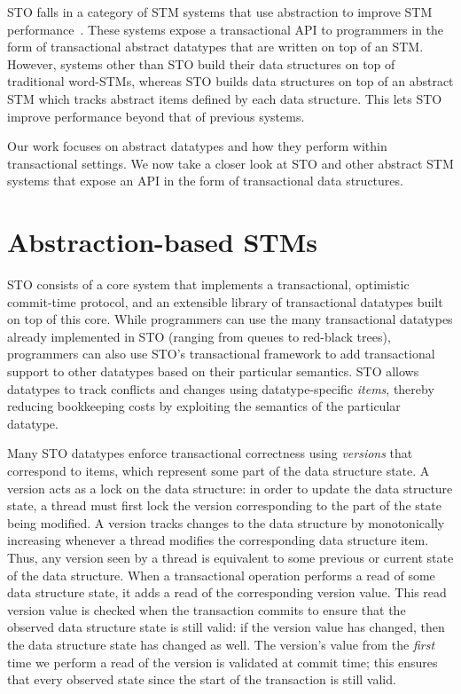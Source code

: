 STO falls in a category of STM systems that use abstraction to improve STM performance~\cite{predication,autolock, optboost, boost}. These systems expose a transactional API to programmers in the form of transactional abstract datatypes that are written on top of an STM. However, systems other than STO build their data structures on top of traditional word-STMs, whereas STO builds data structures on top of an abstract STM which tracks abstract items defined by each data structure. This lets STO improve performance beyond that of previous systems. 

Our work focuses on abstract datatypes and how they perform within transactional settings. We now take a closer look at STO and other abstract STM systems that expose an API in the form of transactional data structures.

\section{Abstraction-based STMs}

STO consists of a core system that implements a transactional, optimistic commit-time protocol, and an extensible library of transactional datatypes built on top of this core. While programmers can use the many transactional datatypes already implemented in STO (ranging from queues to red-black trees), programmers can also use STO's transactional framework to add transactional support to other datatypes based on their particular semantics. STO allows datatypes to track conflicts and changes using datatype-specific \emph{items}, thereby reducing bookkeeping costs by exploiting the semantics of the particular datatype. 

Many STO datatypes enforce transactional correctness using \emph{versions} that correspond to items, which represent some part of the data structure state. A version acts as a lock on the data structure: in order to update the data structure state, a thread must first lock the version corresponding to the part of the state being modified. A version tracks changes to the data structure by monotonically increasing whenever a thread modifies the corresponding data structure item. Thus, any version seen by a thread is equivalent to some previous or current state of the data structure. When a transactional operation performs a read of some data structure state, it adds a read of the corresponding version value. This read version value is checked when the transaction commits to ensure that the observed data structure state is still valid: if the version value has changed, then the data structure state has changed as well.
The version's value from the \emph{first} time we perform a read of the version is validated at commit time; this ensures that every observed state since the start of the transaction is still valid.

